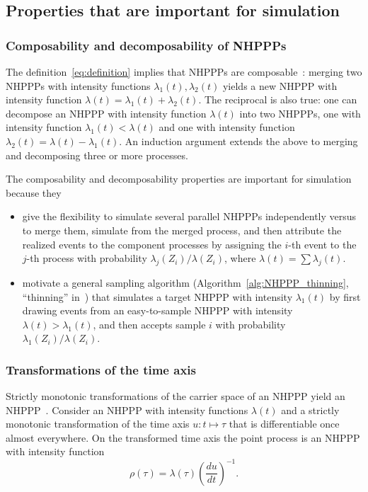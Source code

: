 \documentclass[article,nojss]{jss}\usepackage[]{graphicx}\usepackage[]{xcolor}
\newcommand{\der}[2]{\frac{d {#1}} {d{#2}}}
\begin{document}
\subsection{Properties that are important for simulation}\label{sec:properties}
\subsubsection{Composability and decomposability of NHPPPs}
The definition~\eqref{eq:definition} implies that NHPPPs are composable~\cite[par. 4.2]{cox1965theory}: merging two NHPPPs with intensity functions $\lambda_1(t), \lambda_2(t)$ yields a new NHPPP with intensity function $\lambda(t) = \lambda_1(t) + \lambda_2(t)$. The reciprocal is also true: one can decompose an NHPPP with intensity function $\lambda(t)$ into two NHPPPs, one with intensity function $\lambda_1(t) < \lambda(t)$ and one with intensity function ${\lambda_2(t) = \lambda(t)-\lambda_1(t)}$. An induction argument extends the above to merging and decomposing three or more processes.

The composability and decomposability properties are important for simulation because they
\begin{itemize}
    \item give the flexibility to simulate several parallel NHPPPs independently versus to merge them, simulate from the merged process, and then attribute the realized events to the component processes by assigning the $i$-th event to the $j$-th process with probability $\lambda_j(Z_i) / \lambda(Z_i)$, where $\lambda(t) = \sum \lambda_j(t)$.
    \item motivate a general sampling algorithm (Algorithm~\ref{alg:NHPPP_thinning}, ``thinning'' in~\cite{lewis1979thinning}) that simulates a target NHPPP with intensity $\lambda_1(t)$ by first drawing events from an easy-to-sample NHPPP with intensity $\lambda(t) >\lambda_1(t)$, and then accepts sample $i$ with probability $\lambda_1(Z_i)/\lambda(Z_i)$.
\end{itemize}

\subsubsection{Transformations of the time axis}
Strictly monotonic transformations of the carrier space of an NHPPP yield an NHPPP~\citep{Cinlar1975inversion}. Consider an NHPPP with intensity functions $\lambda(t)$ and a strictly monotonic transformation of the time axis $u: t \mapsto \tau$ that is differentiable once almost everywhere. On the transformed time axis the point process is an NHPPP with intensity function
\begin{equation}\label{eq:transform}
    \rho(\tau) = \lambda(\tau) \left ( \der{u}{t} \right )^{-1}.
\end{equation}
\end{document}
